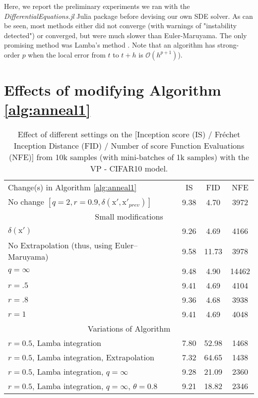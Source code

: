\documentclass{article}
\newcommand{\x}{\boldsymbol{\mathrm{x}}}
\begin{document}
Here, we report the preliminary experiments we ran with the {\em DifferentialEquations.jl} Julia package \citep{DifferentialEquations.jl-2017} before devising our own SDE solver. As can be seen, most methods either did not converge (with warnings of "instability detected") or converged, but were much slower than Euler-Maruyama. The only promising method was Lamba's method \citep{lamba2003adaptive}. Note that an algorithm has strong-order $p$ when the local error from $t$ to $t+h$ is $\mathcal{O}(h^{p+1})$).

\section{Effects of modifying Algorithm \ref{alg:anneal1}}\label{sec:modif}

\begin{table}[!ht]
	\caption{Effect of different settings on the [Inception score (IS) / Fréchet Inception Distance (FID) / Number of score Function Evaluations (NFE)] from 10k samples (with mini-batches of 1k samples) with the VP - CIFAR10 model.}
	\label{tab:table2a}
	\centering
	\begin{tabular}{lccc}
		\toprule
		Change(s) in Algorithm \ref{alg:anneal1} & IS & FID & NFE \\
		\cmidrule(){1-4}
	    No change $\left[ q=2, r=0.9, \delta(\x',\x'_{prev})\right]$ & 9.38 & 4.70 & 3972 \\
	    \cmidrule(){1-4}
	    \multicolumn{4}{c}{Small modifications} \\
	    \cmidrule(){1-4}
	   $\delta(\x')$ & 9.26 & 4.69 & 4166 \\
	    No Extrapolation (thus, using Euler–Maruyama) & 9.58 & 11.73 & 3978 \\
	    $q=\infty$ & 9.48 & 4.90 & 14462 \\
	    $r=.5$ & 9.41 & 4.69 & 4104 \\
	    $r=.8$ & 9.36 & 4.68 & 3938 \\
	    $r=1$  & 9.41 & 4.69 & 4048 \\
	    \cmidrule(){1-4}
	    \multicolumn{4}{c}{Variations of \citet{lamba2003adaptive} Algorithm}\\
	    \cmidrule(){1-4}
	    $r=0.5$, Lamba integration & 7.80 & 52.98 & 1468 \\
	    $r=0.5$, Lamba integration, Extrapolation & 7.32 & 64.65 & 1438 \\
	   $r=0.5$, Lamba integration, $q=\infty$ & 9.28 & 21.09 & 2360 \\
	   $r=0.5$, Lamba integration, $q=\infty$, $\theta=0.8$ & 9.21 & 18.82 & 2346 \\
		\bottomrule
	\end{tabular}
\end{table}
\end{document}
